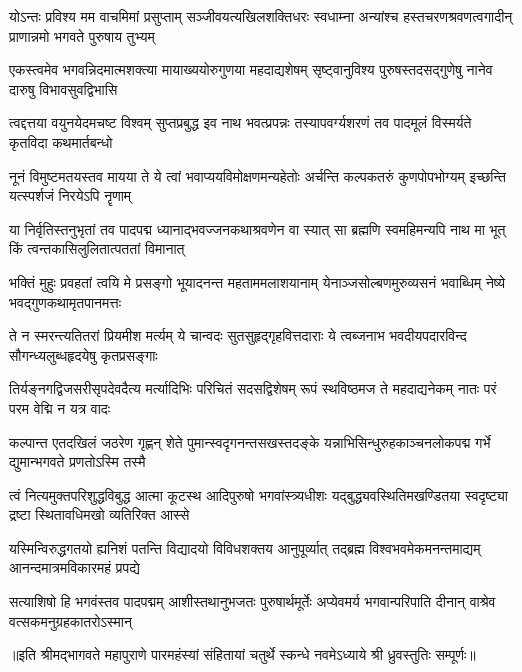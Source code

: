 
\fourlineindentedshloka
{योऽन्तः प्रविश्य मम वाचमिमां प्रसुप्ताम्}
{सञ्जीवयत्यखिलशक्तिधरः स्वधाम्ना}
{अन्यांश्च हस्तचरणश्रवणत्वगादीन्}
{प्राणान्नमो भगवते पुरुषाय तुभ्यम्}

\fourlineindentedshloka
{एकस्त्वमेव भगवन्निदमात्मशक्त्या}
{मायाख्ययोरुगुणया महदाद्यशेषम्}
{सृष्ट्वानुविश्य पुरुषस्तदसद्गुणेषु}
{नानेव दारुषु विभावसुवद्विभासि}

\fourlineindentedshloka
{त्वद्दत्तया वयुनयेदमचष्ट विश्वम्}
{सुप्तप्रबुद्ध इव नाथ भवत्प्रपन्नः}
{तस्यापवर्ग्यशरणं तव पादमूलं}
{विस्मर्यते कृतविदा कथमार्तबन्धो}

\fourlineindentedshloka
{नूनं विमुष्टमतयस्तव मायया ते}
{ये त्वां भवाप्ययविमोक्षणमन्यहेतोः}
{अर्चन्ति कल्पकतरुं कुणपोपभोग्यम्}
{इच्छन्ति यत्स्पर्शजं निरयेऽपि नॄणाम्}

\fourlineindentedshloka
{या निर्वृतिस्तनुभृतां तव पादपद्म}
{ध्यानाद्भवज्जनकथाश्रवणेन वा स्यात्}
{सा ब्रह्मणि स्वमहिमन्यपि नाथ मा भूत्}
{किं त्वन्तकासिलुलितात्पततां विमानात्}

\fourlineindentedshloka
{भक्तिं मुहुः प्रवहतां त्वयि मे प्रसङ्गो}
{भूयादनन्त महताममलाशयानाम्}
{येनाञ्जसोल्बणमुरुव्यसनं भवाब्धिम्}
{नेष्ये भवद्गुणकथामृतपानमत्तः}

\fourlineindentedshloka
{ते न स्मरन्त्यतितरां प्रियमीश मर्त्यम्}
{ये चान्वदः सुतसुहृद्गृहवित्तदाराः}
{ये त्वब्जनाभ भवदीयपदारविन्द}
{सौगन्ध्यलुब्धहृदयेषु कृतप्रसङ्गाः}

\fourlineindentedshloka
{तिर्यङ्नगद्विजसरीसृपदेवदैत्य}
{मर्त्यादिभिः परिचितं सदसद्विशेषम्}
{रूपं स्थविष्ठमज ते महदाद्यनेकम्}
{नातः परं परम वेद्मि न यत्र वादः}

\fourlineindentedshloka
{कल्पान्त एतदखिलं जठरेण गृह्णन्}
{शेते पुमान्स्वदृगनन्तसखस्तदङ्के}
{यन्नाभिसिन्धुरुहकाञ्चनलोकपद्म}
{गर्भे द्युमान्भगवते प्रणतोऽस्मि तस्मै}

\fourlineindentedshloka
{त्वं नित्यमुक्तपरिशुद्धविबुद्ध आत्मा}
{कूटस्थ आदिपुरुषो भगवांस्त्र्यधीशः}
{यद्बुद्ध्यवस्थितिमखण्डितया स्वदृष्ट्या}
{द्रष्टा स्थितावधिमखो व्यतिरिक्त आस्से}

\fourlineindentedshloka
{यस्मिन्विरुद्धगतयो ह्यनिशं पतन्ति}
{विद्यादयो विविधशक्तय आनुपूर्व्यात्}
{तद्ब्रह्म विश्वभवमेकमनन्तमाद्यम्}
{आनन्दमात्रमविकारमहं प्रपद्ये}

\fourlineindentedshloka
{सत्याशिषो हि भगवंस्तव पादपद्मम्}
{आशीस्तथानुभजतः पुरुषार्थमूर्तेः}
{अप्येवमर्य भगवान्परिपाति दीनान्}
{वाश्रेव वत्सकमनुग्रहकातरोऽस्मान्}

{॥इति श्रीमद्भागवते महापुराणे पारमहंस्यां संहितायां चतुर्थे स्कन्धे नवमेऽध्याये श्री ध्रुवस्तुतिः सम्पूर्णः॥}
